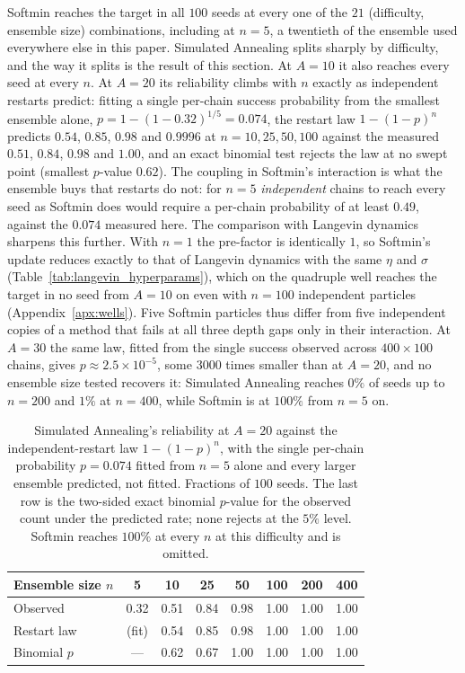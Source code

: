 \documentclass{article} %
\theoremstyle{plain}
\theoremstyle{definition}
\theoremstyle{remark}
\begin{document}
Softmin reaches the target in all $100$ seeds at every one of the $21$ (difficulty, ensemble size)
combinations, including at $n=5$, a twentieth of the ensemble used everywhere else in this paper.
Simulated Annealing splits sharply by difficulty, and the way it splits is the result of this
section. At $A=10$ it also reaches every seed at every $n$. At $A=20$ its reliability climbs with
$n$ exactly as independent restarts predict: fitting a single per-chain success probability from
the smallest ensemble alone, $p=1-(1-0.32)^{1/5}=0.074$, the restart law $1-(1-p)^n$ predicts
$0.54$, $0.85$, $0.98$ and $0.9996$ at $n=10,25,50,100$ against the measured $0.51$, $0.84$,
$0.98$ and $1.00$, and an exact binomial test rejects the law at no swept point (smallest
$p$-value $0.62$). The coupling in Softmin's interaction is what the ensemble buys that restarts
do not: for $n=5$ \emph{independent} chains to reach every seed as Softmin does would require a
per-chain probability of at least $0.49$, against the $0.074$ measured here. The comparison with
Langevin dynamics sharpens this further. With $n=1$ the pre-factor is identically $1$, so Softmin's
update reduces exactly to that of Langevin dynamics with the same $\eta$ and $\sigma$
(Table~\ref{tab:langevin_hyperparams}), which on the quadruple well reaches the target in no seed from
$A=10$ on even with $n=100$ independent particles (Appendix~\ref{apx:wells}). Five Softmin particles
thus differ from five independent copies of a method that fails at all three depth gaps only in their
interaction. At $A=30$ the same
law, fitted from the single success observed across $400\times100$ chains, gives
$p\approx2.5\times10^{-5}$, some $3000$ times smaller than at $A=20$, and no ensemble size tested
recovers it: Simulated Annealing reaches $0\%$ of seeds up to $n=200$ and $1\%$ at $n=400$, while
Softmin is at $100\%$ from $n=5$ on.

\begin{table}[!htbp]
  \centering
  \caption{Simulated Annealing's reliability at $A=20$ against the independent-restart law
  $1-(1-p)^n$, with the single per-chain probability $p=0.074$ fitted from $n=5$ alone and every
  larger ensemble predicted, not fitted. Fractions of $100$ seeds. The last row is the two-sided
  exact binomial $p$-value for the observed count under the predicted rate; none rejects at the
  $5\%$ level. Softmin reaches $100\%$ at every $n$ at this difficulty and is omitted.}
  \label{tab:restart_law}
  \begin{tabular}{lccccccc}
    \toprule
    Ensemble size $n$ & 5 & 10 & 25 & 50 & 100 & 200 & 400 \\
    \midrule
    Observed          & 0.32 & 0.51 & 0.84 & 0.98 & 1.00 & 1.00 & 1.00 \\
    Restart law       & (fit) & 0.54 & 0.85 & 0.98 & 1.00 & 1.00 & 1.00 \\
    Binomial $p$      & --- & 0.62 & 0.67 & 1.00 & 1.00 & 1.00 & 1.00 \\
    \bottomrule
  \end{tabular}
\end{table}
\end{document}
